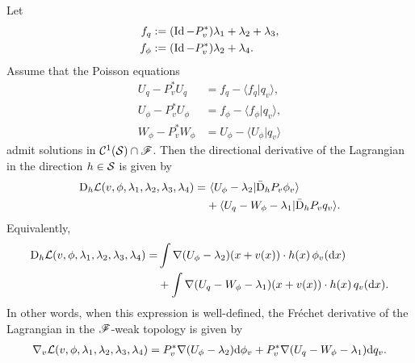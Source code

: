 \documentclass[twoside,10pt]{../jmlr}
\begin{document}
\begin{lemma}\label{lemma: lagrangian gradient via poisson equations}
    Let
    \begin{align}
        f_q&:=(\operatorname{Id}-P_v^*)\lambda_1+\lambda_2+\lambda_3,\\
        f_\phi&:=(\operatorname{Id}-P_v^*)\lambda_2+\lambda_4.
    \end{align}
    Assume that the Poisson equations
    \begin{align}
        U_q-P_v^*U_q&=f_q-\langle f_q\vert q_v\rangle,\\
        U_\phi-P_v^*U_\phi&=f_\phi-\langle f_\phi\vert q_v\rangle,\\
        W_\phi-P_v^*W_\phi&=U_\phi-\langle U_\phi\vert q_v\rangle
    \end{align}
    admit solutions in $\mathcal{C}^1(\mathcal{S})\cap\mathscr{F}$. Then the directional derivative of the Lagrangian in the direction $h\in\mathcal{S}$ is given by
    \begin{align}
        \mathrm{D}_h\mathcal{L}(v,\phi,\lambda_1,\lambda_2,\lambda_3,\lambda_4)
        =&\ \langle U_\phi-\lambda_2\vert \bar{\mathrm{D}}_h P_v\phi_v\rangle\notag\\
        &+\langle U_q-W_\phi-\lambda_1\vert \bar{\mathrm{D}}_h P_v q_v\rangle.
    \end{align}
    Equivalently,
    \begin{align}
        \mathrm{D}_h\mathcal{L}(v,\phi,\lambda_1,\lambda_2,\lambda_3,\lambda_4)
        =&\int \nabla (U_\phi-\lambda_2)(x+v(x))\cdot h(x)\,\phi_v(\mathrm{d} x)\notag\\
        &+\int \nabla (U_q-W_\phi-\lambda_1)(x+v(x))\cdot h(x)\,q_v(\mathrm{d} x).
    \end{align}
    In other words, when this expression is well-defined, the Fréchet derivative of the Lagrangian in the $\mathscr{F}$-weak topology is given by
    \begin{align}
        \nabla_v \mathcal{L}(v,\phi,\lambda_1,\lambda_2,\lambda_3,\lambda_4)=P_v^*\nabla (U_\phi-\lambda_2)\mathrm{d}\phi_v+P_v^*\nabla (U_q-W_\phi-\lambda_1)\mathrm{d} q_v.
    \end{align}
\end{lemma}
\end{document}
